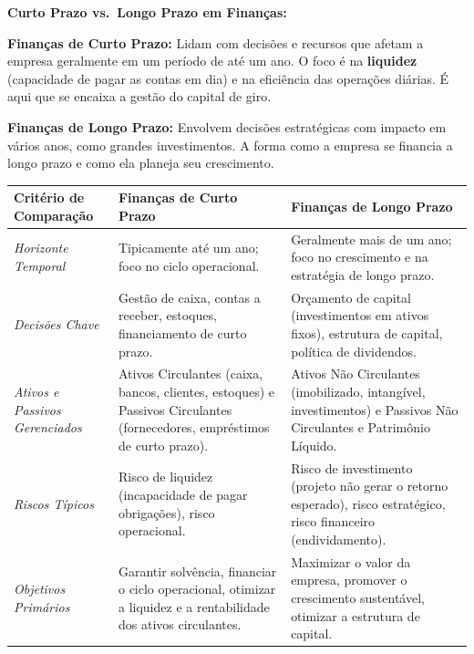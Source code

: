 \documentclass[
  a4paper,
]{book}
\begin{document}
\textbf{Curto Prazo vs.~Longo Prazo em Finanças:}

\textbf{Finanças de Curto Prazo:} Lidam com decisões e recursos que
afetam a empresa geralmente em um período de até um ano. O foco é na
\textbf{liquidez} (capacidade de pagar as contas em dia) e na eficiência
das operações diárias. É aqui que se encaixa a gestão do capital de
giro.

\textbf{Finanças de Longo Prazo:} Envolvem decisões estratégicas com
impacto em vários anos, como grandes investimentos. A forma como a
empresa se financia a longo prazo e como ela planeja seu crescimento.

\begin{longtable}[]{@{}
  >{\raggedright\arraybackslash}p{}
  >{\raggedright\arraybackslash}p{}
  >{\raggedright\arraybackslash}p{}@{}}
\toprule\noalign{}
\begin{minipage}[b]{\linewidth}\raggedright
Critério de Comparação
\end{minipage} & \begin{minipage}[b]{\linewidth}\raggedright
Finanças de Curto Prazo
\end{minipage} & \begin{minipage}[b]{\linewidth}\raggedright
Finanças de Longo Prazo
\end{minipage} \\
\midrule\noalign{}
\endhead
\bottomrule\noalign{}
\endlastfoot
\emph{Horizonte Temporal} & Tipicamente até um ano; foco no ciclo
operacional. & Geralmente mais de um ano; foco no crescimento e na
estratégia de longo prazo. \\
\emph{Decisões Chave} & Gestão de caixa, contas a receber, estoques,
financiamento de curto prazo. & Orçamento de capital (investimentos em
ativos fixos), estrutura de capital, política de dividendos. \\
\emph{Ativos e Passivos Gerenciados} & Ativos Circulantes (caixa,
bancos, clientes, estoques) e Passivos Circulantes (fornecedores,
empréstimos de curto prazo). & Ativos Não Circulantes (imobilizado,
intangível, investimentos) e Passivos Não Circulantes e Patrimônio
Líquido. \\
\emph{Riscos Típicos} & Risco de liquidez (incapacidade de pagar
obrigações), risco operacional. & Risco de investimento (projeto não
gerar o retorno esperado), risco estratégico, risco financeiro
(endividamento). \\
\emph{Objetivos Primários} & Garantir solvência, financiar o ciclo
operacional, otimizar a liquidez e a rentabilidade dos ativos
circulantes. & Maximizar o valor da empresa, promover o crescimento
sustentável, otimizar a estrutura de capital. \\
\end{longtable}
\end{document}
